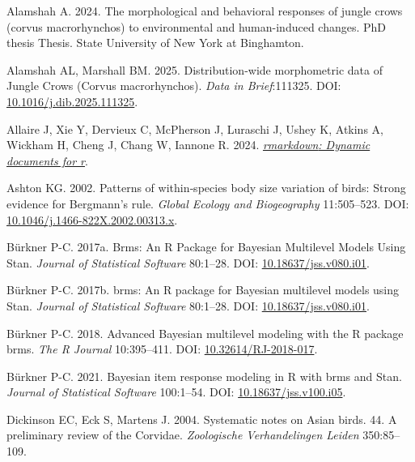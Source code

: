 \documentclass[10pt,a4paper]{article}
\newlength{\cslhangindent}
\newenvironment{CSLReferences}[2] %
 {\begin{list}{}{%
  \setlength{\itemindent}{0pt}
  \setlength{\leftmargin}{0pt}
  \setlength{\parsep}{0pt}
  \ifodd #1
   \setlength{\leftmargin}{\cslhangindent}
   \setlength{\itemindent}{-1\cslhangindent}
  \fi
  \setlength{\itemsep}{#2\baselineskip}}}
 {\end{list}}
\begin{document}
\label{refs}
\begin{CSLReferences}{1}{0}
Alamshah A. 2024. The morphological and behavioral responses of jungle crows (corvus macrorhynchos) to environmental and human-induced changes. PhD thesis Thesis. State University of New York at Binghamton.

Alamshah AL, Marshall BM. 2025. Distribution-wide morphometric data of {Jungle} {Crows} ({Corvus} macrorhynchos). \emph{Data in Brief}:111325. DOI: \href{https://doi.org/10.1016/j.dib.2025.111325}{10.1016/j.dib.2025.111325}.

Allaire J, Xie Y, Dervieux C, McPherson J, Luraschi J, Ushey K, Atkins A, Wickham H, Cheng J, Chang W, Iannone R. 2024. \emph{\href{https://github.com/rstudio/rmarkdown}{{rmarkdown}: Dynamic documents for r}}.

Ashton KG. 2002. Patterns of within‐species body size variation of birds: Strong evidence for {Bergmann}'s rule. \emph{Global Ecology and Biogeography} 11:505--523. DOI: \href{https://doi.org/10.1046/j.1466-822X.2002.00313.x}{10.1046/j.1466-822X.2002.00313.x}.

Bürkner P-C. 2017a. Brms: {An} {R} {Package} for {Bayesian} {Multilevel} {Models} {Using} {Stan}. \emph{Journal of Statistical Software} 80:1--28. DOI: \href{https://doi.org/10.18637/jss.v080.i01}{10.18637/jss.v080.i01}.

Bürkner P-C. 2017b. {brms}: An {R} package for {Bayesian} multilevel models using {Stan}. \emph{Journal of Statistical Software} 80:1--28. DOI: \href{https://doi.org/10.18637/jss.v080.i01}{10.18637/jss.v080.i01}.

Bürkner P-C. 2018. Advanced {Bayesian} multilevel modeling with the {R} package {brms}. \emph{The R Journal} 10:395--411. DOI: \href{https://doi.org/10.32614/RJ-2018-017}{10.32614/RJ-2018-017}.

Bürkner P-C. 2021. Bayesian item response modeling in {R} with {brms} and {Stan}. \emph{Journal of Statistical Software} 100:1--54. DOI: \href{https://doi.org/10.18637/jss.v100.i05}{10.18637/jss.v100.i05}.

Dickinson EC, Eck S, Martens J. 2004. Systematic notes on {Asian} birds. 44. {A} preliminary review of the {Corvidae}. \emph{Zoologische Verhandelingen Leiden} 350:85--109.


\end{CSLReferences}
\end{document}
